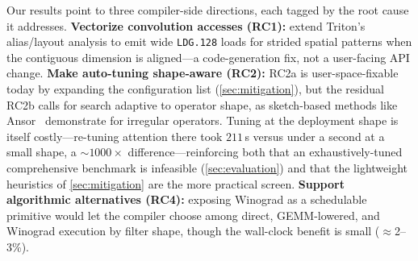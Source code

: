 Our results point to three compiler-side directions, each tagged by the root cause it addresses.
\textbf{Vectorize convolution accesses (RC1):} extend Triton's alias/layout analysis to emit wide \texttt{LDG.128} loads for strided spatial patterns when the contiguous dimension is aligned---a code-generation fix, not a user-facing API change.
\textbf{Make auto-tuning shape-aware (RC2):} RC2a is user-space-fixable today by expanding the configuration list (\cref{sec:mitigation}), but the residual RC2b calls for search adaptive to operator shape, as sketch-based methods like Ansor~\cite{zheng2020ansor} demonstrate for irregular operators. Tuning at the deployment shape is itself costly---re-tuning attention there took $211$\,s versus under a second at a small shape, a ${\sim}1000\times$ difference---reinforcing both that an exhaustively-tuned comprehensive benchmark is infeasible (\cref{sec:evaluation}) and that the lightweight heuristics of \cref{sec:mitigation} are the more practical screen.
\textbf{Support algorithmic alternatives (RC4):} exposing Winograd as a schedulable primitive would let the compiler choose among direct, GEMM-lowered, and Winograd execution by filter shape, though the wall-clock benefit is small ($\approx$2--3\%).




